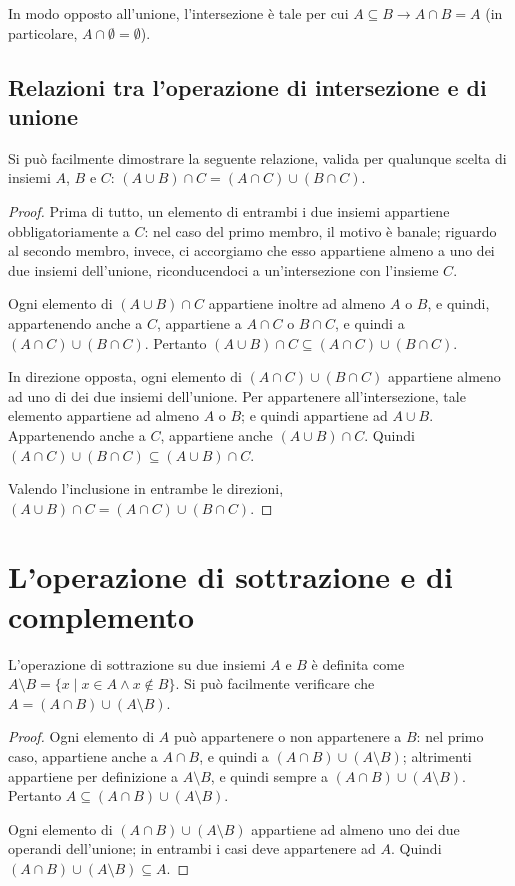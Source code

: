In modo opposto all'unione, l'intersezione è tale per cui $A \subseteq B \rightarrow
    A \cap B = A$ (in particolare, $A \cap \emptyset = \emptyset$).

\subsection{Relazioni tra l'operazione di intersezione e di unione}

Si può facilmente dimostrare la seguente relazione, valida per qualunque scelta
di insiemi $A$, $B$ e $C$: $(A \cup B) \cap C = (A \cap C) \cup (B \cap C)$.

\begin{proof}
    Prima di tutto, un elemento di entrambi i due insiemi appartiene obbligatoriamente a $C$:
    nel caso del primo membro, il motivo è banale; riguardo al secondo membro, invece, ci accorgiamo
    che esso appartiene almeno a uno dei due insiemi dell'unione, riconducendoci a un'intersezione
    con l'insieme $C$.

    Ogni elemento di $(A \cup B) \cap C$ appartiene inoltre ad almeno $A$ o $B$, e quindi,
    appartenendo anche a $C$, appartiene a $A \cap C$ o $B \cap C$, e quindi a $(A \cap C) \cup (B \cap C)$.
    Pertanto $(A \cup B) \cap C \subseteq (A \cap C) \cup (B \cap C)$.

    In direzione opposta, ogni elemento di $(A \cap C) \cup (B \cap C)$ appartiene almeno
    ad uno di dei due insiemi dell'unione. Per appartenere all'intersezione, tale elemento
    appartiene ad almeno $A$ o $B$; e quindi appartiene ad $A \cup B$. Appartenendo anche a $C$,
    appartiene anche $(A \cup B) \cap C$. Quindi $(A \cap C) \cup (B \cap C) \subseteq (A \cup B) \cap C$.

    Valendo l'inclusione in entrambe le direzioni, $(A \cup B) \cap C = (A \cap C) \cup (B \cap C)$.
\end{proof}

\section{L'operazione di sottrazione e di complemento}

L'operazione di sottrazione su due insiemi $A$ e $B$ è definita come
$A \setminus B = \{x \mid x \in A \land x \notin B\}$. Si può facilmente
verificare che $A = (A \cap B) \cup (A \setminus B)$.

\begin{proof}
    Ogni elemento di $A$ può appartenere o non appartenere a $B$: nel primo caso,
    appartiene anche a $A \cap B$, e quindi a $(A \cap B) \cup (A \setminus B)$;
    altrimenti appartiene per definizione a $A \setminus B$, e quindi sempre
    a $(A \cap B) \cup (A \setminus B)$. Pertanto $A \subseteq (A \cap B) \cup (A \setminus B)$.

    Ogni elemento di $(A \cap B) \cup (A \setminus B)$ appartiene ad almeno uno
    dei due operandi dell'unione; in entrambi i casi deve appartenere ad $A$. Quindi
    $(A \cap B) \cup (A \setminus B) \subseteq A$.
\end{proof}

